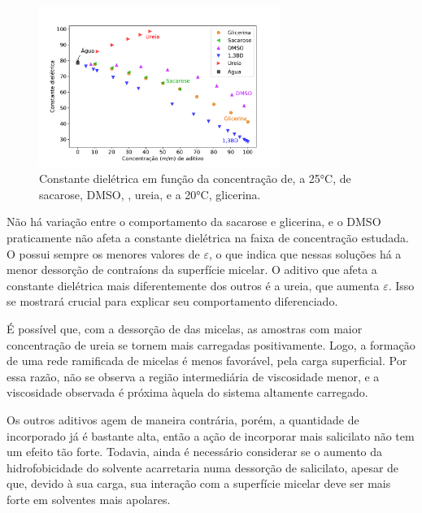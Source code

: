 		\begin{figure}[h]
			\centering
			\includegraphics[width=0.7\textwidth]{imagens/propriedades/cte_dieletrica}
			\caption{Constante dielétrica em função da concentração de, a 25°C, de sacarose,\cite{Malmberg1950a} DMSO,\cite{Kaatze1989a} \BD,\cite{Piekarski1995} ureia\cite{Wyman1933}, e a 20°C, glicerina.\cite{Akerlof1932}}  %
			\label{fig:cte_dieletrica}
		\end{figure}
	
		Não há variação entre o comportamento da sacarose e glicerina, e o DMSO praticamente não afeta a constante dielétrica na faixa de concentração estudada. O \BD{} possui sempre os menores valores de \(\varepsilon\), o que indica que nessas soluções há a menor dessorção de contraíons da superfície micelar. O aditivo que afeta a constante dielétrica mais diferentemente dos outros é a ureia, que aumenta \(\varepsilon\). Isso se mostrará crucial para explicar seu comportamento diferenciado.
	
		É possível que, com a dessorção de \Sal{} das micelas, as amostras com maior concentração de ureia se tornem mais carregadas positivamente. Logo, a formação de uma rede ramificada de micelas é menos favorável, pela carga superficial. Por essa razão, não se observa a região intermediária de viscosidade menor, e a viscosidade observada é próxima àquela do sistema altamente carregado.
		
		Os outros aditivos agem de maneira contrária, porém, a quantidade de \Sal{} incorporado já é bastante alta, então a ação de incorporar mais salicilato não tem um efeito tão forte. %
		Todavia, ainda é necessário considerar se o aumento da hidrofobicidade do solvente acarretaria numa dessorção de salicilato, apesar de que, devido à sua carga, sua interação com a superfície micelar deve ser mais forte em solventes mais apolares.
	
